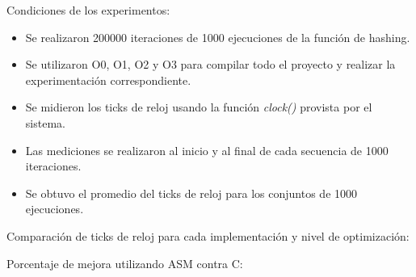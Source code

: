 \documentclass[a4paper, 10pt, twoside]{article}
\begin{document}
Condiciones de los experimentos:
\begin{itemize}
  \item Se realizaron 200000 iteraciones de 1000 ejecuciones de la función de hashing.
  \item Se utilizaron O0, O1, O2 y O3 para compilar todo el proyecto y realizar la experimentación correspondiente.
  \item Se midieron los ticks de reloj usando la función \textit{clock()} provista por el sistema.
  \item Las mediciones se realizaron al inicio y al final de cada secuencia de 1000 iteraciones.
  \item Se obtuvo el promedio del ticks de reloj para los conjuntos de 1000 ejecuciones.
\end{itemize}

Comparación de ticks de reloj para cada implementación y nivel de optimización:

\begin{center}
\end{center}







Porcentaje de mejora utilizando ASM contra C:

\begin{center}
\end{center}
\end{document}
